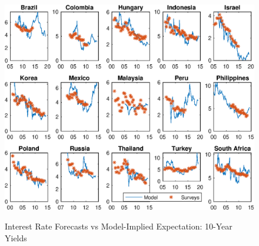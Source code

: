 \documentclass{article}
\begin{document}
\begin{figure}[tbph]
	\begin{center}
		\caption{Interest Rate Forecasts vs Model-Implied Expectation: 10-Year Yields}
		\label{fig:bsl_yP_scbp}
		\includegraphics[trim={0cm 0cm 0cm 0cm},clip,height=1\textheight,width=1.4\textwidth]{../Figures/Estimation/bsl_yP_scbp.eps} \\
	\end{center}
\end{figure}
\end{document}
